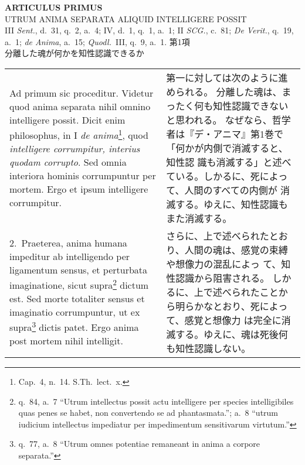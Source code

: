 \documentclass[10pt]{jsarticle} %
\begin{document}
\newpage
{}

\begin{center}
{\bf \Large ARTICULUS PRIMUS}\\
{\large UTRUM ANIMA SEPARATA ALIQUID INTELLIGERE POSSIT}\\
{\footnotesize III {\it Sent.}, d.~31, q.~2, a.~4; IV, d.~1, q.~1, a.~1; II
 {\it SCG.},
 c.~81; {\it De Verit.}, q.~19, a.~1; {\it de Anima}, a.~15; {\it Quodl.}~III, q.~9,
 a.~1.}
{\Large 第1項\\分離した魂が何かを知性認識できるか}

\end{center}

\begin{longtable}{p{21em}p{21em}}

{\huge A}{\sc d primum sic proceditur}. Videtur quod anima separata nihil omnino
 intelligere possit. Dicit enim philosophus, in I {\it de
 anima}\footnote{Cap.~4, n.~14. S.Th.~lect.~x.}, quod
 {\it intelligere corrumpitur, interius quodam corrupto}. Sed omnia interiora
 hominis corrumpuntur per mortem. Ergo et ipsum intelligere corrumpitur.

&
第一に対しては次のように進められる。
分離した魂は、まったく何も知性認識できないと思われる。
なぜなら、哲学者は『デ・アニマ』第1巻で「何かが内側で消滅すると、知性認
 識も消滅する」と述べている。しかるに、死によって、人間のすべての内側が
 消滅する。ゆえに、知性認識もまた消滅する。


\\

2.~{\sc Praeterea}, anima humana impeditur ab
 intelligendo per ligamentum
 sensus, et perturbata imaginatione, sicut
 supra\footnote{q.~84, a.~7 ``Utrum intellectus possit actu intelligere
 per species intelligibiles quas penes se habet, non convertendo se ad
 phantasmata.''; a.~8 ``utrum iudicium intellectus impediatur per
 impedimentum sensitivarum virtutum.''} dictum est. Sed morte totaliter sensus et imaginatio
 corrumpuntur, ut ex supra\footnote{q.~77, a.~8 ``Utrum omnes potentiae
 remaneant in anima a corpore separata.''} dictis patet. Ergo anima post mortem nihil
 intelligit.

&
さらに、上で述べられたとおり、人間の魂は、感覚の束縛や想像力の混乱によっ
 て、知性認識から阻害される。
しかるに、上で述べられたことから明らかなとおり、死によって、感覚と想像力
 は完全に消滅する。ゆえに、魂は死後何も知性認識しない。


\\




\end{longtable}
\end{document}
